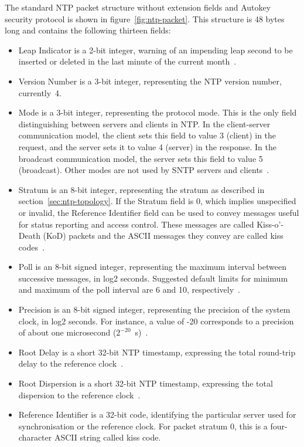 The standard NTP packet structure without extension fields and
Autokey security protocol is shown in figure~\ref{fig:ntp-packet}.
This structure is 48 bytes long and contains the following thirteen fields:
\begin{itemize}
\item
Leap Indicator is a 2-bit integer, warning of an impending leap
second to be inserted or deleted in the last minute of the current month~\cite{rfc5905}.
\item
Version Number is a 3-bit integer, representing the NTP
version number, currently~4.
\item
Mode is a 3-bit integer, representing the protocol mode.
This is the only field distinguishing between servers and clients in NTP.
In the client-server communication model, the client sets this field to value 3 (client) in the request,
and the server sets it to value 4 (server) in the response.
In the broadcast communication model, the server sets this field to value 5 (broadcast).
Other modes are not used by SNTP servers and clients~\cite{rfc5905}.
\item
Stratum is an 8-bit integer, representing the stratum as described in section~\ref{sec:ntp-topology}.
If the Stratum field is 0, which implies unspecified or invalid, the
Reference Identifier field can be used to convey messages useful for
status reporting and access control.
These messages are called Kiss-o'-Death (KoD)
packets and the ASCII messages they convey are called kiss codes~\cite{rfc5905}.
\item
Poll is an 8-bit signed integer, representing the maximum interval between
successive messages, in log2 seconds.
Suggested default limits for minimum and maximum of the poll interval are 6 and 10, respectively~\cite{rfc5905}.
\item
Precision is an 8-bit signed integer, representing the precision of the
system clock, in log2 seconds.
For instance, a value of -20
corresponds to a precision of about one microsecond ($2^{-20}$~s)~\cite{rfc5905}.
\item
Root Delay is a short 32-bit NTP timestamp, expressing the
total round-trip delay to the reference clock~\cite{rfc5905}.
\item
Root Dispersion is a short 32-bit NTP timestamp, expressing the
total dispersion to the reference clock~\cite{rfc5905}.
\item
Reference Identifier is a 32-bit code, identifying the particular server used for synchronisation
or the reference clock.
For packet stratum 0, this is a four-character ASCII string called kiss code.

\end{itemize}
